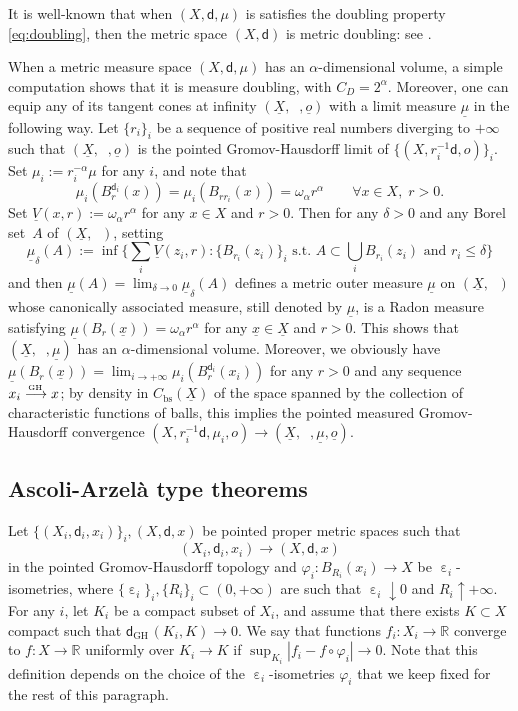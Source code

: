 \documentclass[JEP,XML,SOM,Unicode,published]{cedram}
\def\To#1{\mathchoice{\xrightarrow{\textstyle\kern4pt#1\kern3pt}}{\stackrel{#1}{\longrightarrow}}{}{}}
\newcommand{\sGH}{{\scriptscriptstyle\mathrm{GH}\,}}
\let\sep:
\theoremstyle{plain}
\theoremstyle{definition}
\newcommand{\setR}{\mathbb{R}}
\let\eps\upepsilon
\let\phi\varphi
\newcommand{\bs}{\mathrm{bs}}
\newcommand{\dist}{\mathsf{d}}
\newcommand{\uX}{\underline{X}}
\DeclareMathOperator{\udist}{\underline{\dist}}
\newcommand{\uo}{\underline{o}}
\newcommand{\ux}{\underline{x}}
\newcommand{\umu}{\underline{\mu}}
\begin{document}
It is well-known that when $(X,\dist,\mu)$ is satisfies the doubling property \eqref{eq:doubling}, then the metric space $(X,\dist)$ is metric doubling: see \eg \cite[\S 2.5]{AmbrosioColomboDiMarino}.

When a metric measure space $(X,\dist,\mu)$ has an $\alpha$-dimensional volume, a simple computation shows that it is measure doubling, with $C_D=2^\alpha$. Moreover, one can equip any of its tangent cones at infinity $(\uX,\udist,\uo)$ with a limit measure $\umu$ in the following way. Let $\{r_i\}_i$ be a sequence of positive real numbers diverging to $+\infty$ such that $(\uX,\udist,\uo)$ is the pointed Gromov-Hausdorff limit of $\{(X,r_i^{-1}\dist,o)\}_i$. Set $\mu_i:=r_i^{-\alpha}\mu$ for any $i$, and note that
\[
\mu_i(B_r^{\dist_i}(x)) = \mu_i(B_{r r_i}(x)) = \omega_\alpha r^\alpha \qquad \forall x \in X,\; r>0.
\]
Set $\underline{V}(x,r):=\omega_\alpha r^\alpha$ for any $x \in X$ and $r>0$. Then for any $\delta>0$ and any Borel set~$A$ of $(\uX,\udist)$, setting
\[\textstyle
\umu_\delta(A):= \inf\bigl\{ \sum_{i} \underline{V}(z_i,r) \sep \{B_{r_i}(z_i)\}_i\, \, \text{s.t. $A \subset \bigcup_i B_{r_i}(z_i)$ and $r_i \le \delta$} \bigr\}
\]
and then $\umu(A) = \lim_{\delta \to 0} \umu_\delta(A)$ defines a metric outer measure $\umu$ on $(\uX,\udist)$ whose canonically associated measure, still denoted by $\umu$, is a Radon measure satisfying $\umu(B_r(\ux)) = \omega_\alpha r^\alpha$ for any $\ux \in \uX$ and $r>0$. This shows that $(\uX,\udist,\umu)$ has an $\alpha$\nobreakdash-dimen\-sional volume. Moreover, we obviously have $\umu(B_r(\ux))=\lim_{i \to +\infty} \mu_i(B_r^{\dist_i}(x_i))$ for any $r>0$ and any sequence $x_i \To{\sGH} x$; by density in $C_\bs(\uX)$ of the space spanned by the collection of characteristic functions of balls, this implies the pointed measured Gromov-Hausdorff convergence $(X,r_i^{-1}\dist,\mu_i,o) \to (\uX,\udist,\umu,\uo)$.

\subsection*{Ascoli-Arzelà type theorems}

Let $\{(X_i,\dist_i,x_i)\}_i, (X,\dist,x)$ be pointed proper metric spaces such that
\[
(X_i,\dist_i,x_i) \to (X,\dist,x)
\]
in the pointed Gromov-Hausdorff topology and $\phi_i:B_{R_i}(x_i) \to X$ be $\eps_i$-isometries, where $\{\eps_i\}_i, \{R_i\}_i \subset (0,+\infty)$ are such that $\eps_i \downarrow 0$ and $R_i \uparrow +\infty$. For any $i$, let $K_i$ be a compact subset of $X_i$, and assume that there exists $K \subset X$ compact such that $\dist_{\sGH}(K_i,K) \to 0$. We say that functions $f_i:X_i\to\setR$ converge to $f:X\to\setR$ uniformly over $K_i \to K$ if $\sup_{K_i} |f_i - f \circ \phi_i| \to 0$. Note that this definition depends on the choice of the $\eps_i$-isometries $\phi_i$ that we keep fixed for the rest of this paragraph.
\end{document}
